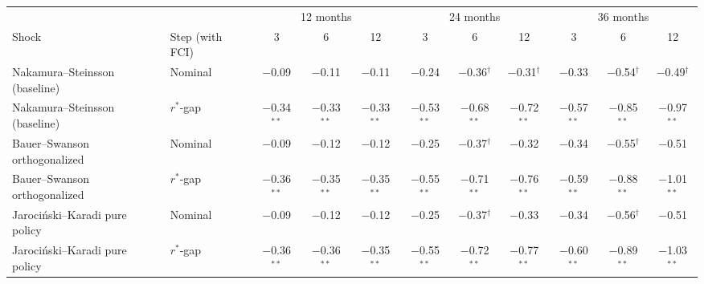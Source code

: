 \begin{tabular}{llccccccccc}
\toprule
 & & \multicolumn{3}{c}{12 months} & \multicolumn{3}{c}{24 months} & \multicolumn{3}{c}{36 months}\\
\cmidrule(lr){3-5}\cmidrule(lr){6-8}\cmidrule(lr){9-11}
Shock & Step (with FCI) & 3 & 6 & 12 & 3 & 6 & 12 & 3 & 6 & 12 \\
\midrule
Nakamura--Steinsson (baseline) & Nominal & $-$0.09 & $-$0.11 & $-$0.11 & $-$0.24 & $-$0.36$^{\dagger}$ & $-$0.31$^{\dagger}$ & $-$0.33 & $-$0.54$^{\dagger}$ & $-$0.49$^{\dagger}$ \\
Nakamura--Steinsson (baseline) & $r^*$-gap & $-$0.34$^{**}$ & $-$0.33$^{**}$ & $-$0.33$^{**}$ & $-$0.53$^{**}$ & $-$0.68$^{**}$ & $-$0.72$^{**}$ & $-$0.57$^{**}$ & $-$0.85$^{**}$ & $-$0.97$^{**}$ \\
\midrule
Bauer--Swanson orthogonalized & Nominal & $-$0.09 & $-$0.12 & $-$0.12 & $-$0.25 & $-$0.37$^{\dagger}$ & $-$0.32 & $-$0.34 & $-$0.55$^{\dagger}$ & $-$0.51 \\
Bauer--Swanson orthogonalized & $r^*$-gap & $-$0.36$^{**}$ & $-$0.35$^{**}$ & $-$0.35$^{**}$ & $-$0.55$^{**}$ & $-$0.71$^{**}$ & $-$0.76$^{**}$ & $-$0.59$^{**}$ & $-$0.88$^{**}$ & $-$1.01$^{**}$ \\
\midrule
Jaroci\'nski--Karadi pure policy & Nominal & $-$0.09 & $-$0.12 & $-$0.12 & $-$0.25 & $-$0.37$^{\dagger}$ & $-$0.33 & $-$0.34 & $-$0.56$^{\dagger}$ & $-$0.51 \\
Jaroci\'nski--Karadi pure policy & $r^*$-gap & $-$0.36$^{**}$ & $-$0.36$^{**}$ & $-$0.35$^{**}$ & $-$0.55$^{**}$ & $-$0.72$^{**}$ & $-$0.77$^{**}$ & $-$0.60$^{**}$ & $-$0.89$^{**}$ & $-$1.03$^{**}$ \\
\bottomrule
\end{tabular}
